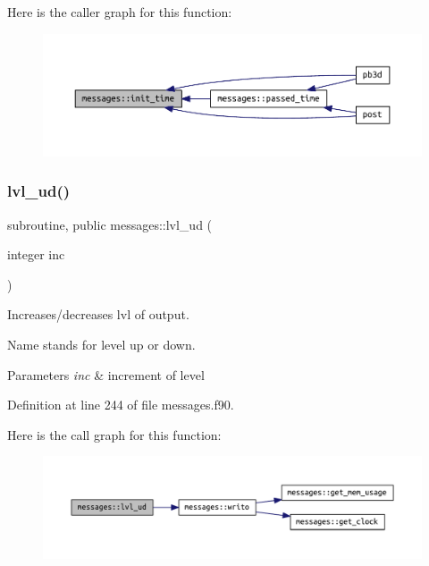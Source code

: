 Here is the caller graph for this function\+:\nopagebreak
\begin{figure}[H]
\begin{center}
\leavevmode
\includegraphics[width=350pt]{namespacemessages_a8ed785522aec7ac549263cdd54a8619a_icgraph}
\end{center}
\end{figure}
\mbox{\label{namespacemessages_a6e6bfb084063e4cc91ee86e542043302}} 
\subsubsection{\texorpdfstring{lvl\+\_\+ud()}{lvl\_ud()}}
{\footnotesize\ttfamily subroutine, public messages\+::lvl\+\_\+ud (\begin{DoxyParamCaption}\item[{integer}]{inc }\end{DoxyParamCaption})}



Increases/decreases {\ttfamily lvl} of output. 

Name stands for level up or down.


\begin{DoxyParams}{Parameters}
{\em inc} & increment of level \\
\hline
\end{DoxyParams}


Definition at line 244 of file messages.\+f90.

Here is the call graph for this function\+:\nopagebreak
\begin{figure}[H]
\begin{center}
\leavevmode
\includegraphics[width=350pt]{namespacemessages_a6e6bfb084063e4cc91ee86e542043302_cgraph}
\end{center}
\end{figure}
\mbox{\label{namespacemessages_a34da9df28502ccd63e62674d51fe8de8}} 
